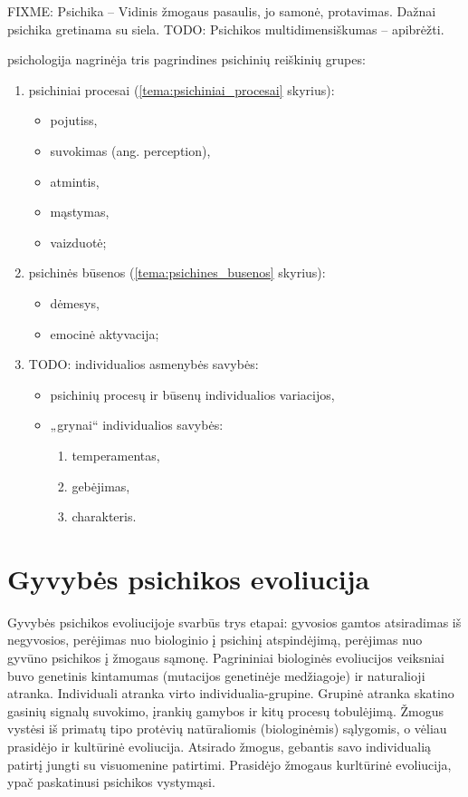 \label{tema:psichikos_samprata}

FIXME: Psichika – Vidinis žmogaus pasaulis, jo samonė, protavimas. Dažnai 
psichika gretinama su siela.
TODO: Psichikos multidimensiškumas – apibrėžti.

\Gls{psichologija} nagrinėja tris pagrindines psichinių reiškinių grupes:

\begin{enumerate}
  \item psichiniai procesai (\ref{tema:psichiniai_procesai} skyrius):
    \begin{itemize}
      \item \glspl{pojutis},
      \item suvokimas (ang. perception),
      \item atmintis,
      \item mąstymas,
      \item vaizduotė;
    \end{itemize}
  \item psichinės būsenos (\ref{tema:psichines_busenos} skyrius):
    \begin{itemize}
      \item dėmesys,
      \item emocinė aktyvacija;
    \end{itemize}
  \item TODO: individualios asmenybės savybės:
    \begin{itemize}
      \item psichinių procesų ir būsenų individualios variacijos,
      \item „grynai“ individualios savybės:
        \begin{enumerate}
          \item temperamentas,
          \item gebėjimas,
          \item charakteris.
        \end{enumerate}
    \end{itemize}
\end{enumerate}

\section{Gyvybės psichikos evoliucija}

\label{tema:gyvybes_psichikos_evoliucija}

Gyvybės psichikos evoliucijoje svarbūs trys etapai: gyvosios gamtos 
atsiradimas iš negyvosios, perėjimas nuo biologinio į psichinį atspindėjimą,
perėjimas nuo gyvūno psichikos į žmogaus sąmonę.
Pagrininiai biologinės evoliucijos veiksniai buvo genetinis kintamumas
(mutacijos genetinėje medžiagoje) ir naturalioji atranka. Individuali 
atranka virto individualia-grupine. Grupinė atranka skatino gasinių signalų
suvokimo, įrankių gamybos ir kitų procesų tobulėjimą. Žmogus vystėsi iš 
primatų tipo protėvių natūraliomis (biologinėmis) sąlygomis, o vėliau 
prasidėjo ir kultūrinė evoliucija. Atsirado žmogus, gebantis savo 
individualią patirtį jungti su visuomenine patirtimi. Prasidėjo žmogaus
 kurltūrinė evoliucija, ypač paskatinusi psichikos vystymąsi.

